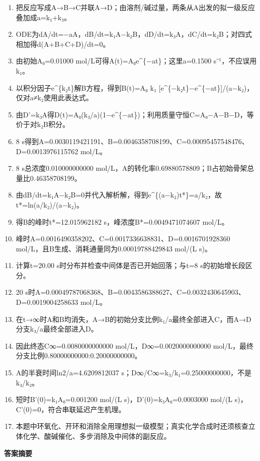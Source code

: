 \documentclass[UTF8,11pt,a4paper]{ctexart}
\begin{document}
\begin{enumerate}
\item 把反应写成A→B→C并联A→D；由溶剂/碱过量，两条从A出发的拟一级反应叠加成a=k₁+k₃。
\item ODE为dA/dt=−aA，dB/dt=k₁A−k₂B，dD/dt=k₃A，dC/dt=k₂B；对四式相加得d(A+B+C+D)/dt=0。
\item 由初始A₀=0.01000 mol/L可得A(t)=A₀e\textasciicircum{}\{−at\}；这里a=0.1500 s⁻¹，不应误用k₁。
\item 以积分因子e\textasciicircum{}\{k₂t\}解B方程，得到B(t)=A₀ k₁ [e\textasciicircum{}\{−k₂t\}−e\textasciicircum{}\{−at\}]/(a−k₂)，仅对a≠k₂使用此表达式。
\item 由D'=k₃A得D(t)=A₀(k₃/a)(1−e\textasciicircum{}\{−at\})；利用质量守恒C=A₀−A−B−D，等价于对k₂B积分。
\item 8 s得到A=0.0030119421191、B=0.0046358708199、C=0.00095457548476、D=0.0013976115762 mol/L。
\item 8 s总浓度0.010000000000 mol/L，A的转化率0.69880578809；B占初始骨架总量比0.46358708199。
\item 由dB/dt=k₁A−k₂B=0并代入解析解，得到e\textasciicircum{}\{(a−k₂)t*\}=a/k₂，故t*=ln(a/k₂)/(a−k₂)。
\item 得B的峰时t*=12.015962182 s，峰浓度B*=0.0049471074607 mol/L。
\item 峰时A=0.0016490358202、C=0.0017336638831、D=0.0016701928360 mol/L，且B生成、消耗通量同为0.00019788429843 mol/(L s)。
\item 计算t=20.00 s时分布并检查中间体是否已开始回落；与t=8 s的初始增长段区分。
\item 20 s时A=0.00049787068368、B=0.0043586388627、C=0.0032430645903、D=0.0019004258633 mol/L。
\item 在t→∞时A和B均消失，A→B的初始分支比例k₁/a最终全部进入C，而A→D分支k₃/a最终全部进入D。
\item 因此终态C∞=0.0080000000000 mol/L，D∞=0.0020000000000 mol/L，最终分支比例0.80000000000:0.20000000000。
\item A的半衰时间ln2/a=4.6209812037 s；D∞/C∞=k₃/k₁=0.25000000000，不是k₃/k₂。
\item 短时B'(0)=k₁A₀=0.001200 mol/(L s)，D'(0)=k₃A₀=0.0003000 mol/(L s)，C'(0)=0，符合串联延迟产生机理。
\item 本题中环氧化、开环和消除全用理想拟一级模型；真实化学合成时还须核查立体化学、酸碱催化、多步消除及中间体的副反应。
\end{enumerate}
\noindent\textbf{答案摘要}\par
\end{document}
